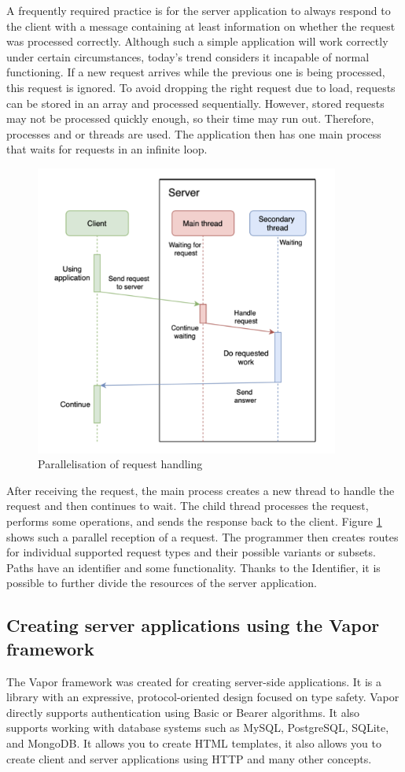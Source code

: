 \documentclass[
  biblatex = false,
  language=english,
  figures=false,
  sourcecodes,
  glossaries,
  index
]{kidiplom}
\begin{document}
A frequently required practice is for the server application to always respond to the client with a message containing at least information on whether the request was processed correctly.
Although such a simple application will work correctly under certain circumstances, today's trend considers it incapable of normal functioning. If a new request arrives while the previous one is being processed, this request is ignored. To avoid dropping the right request due to load, requests can be stored in an array and processed sequentially. However, stored requests may not be processed quickly enough, so their time may run out. Therefore, processes and or threads are used. The application then has one main process that waits for requests in an infinite loop.

\begin{figure}[h]
\centering
\includegraphics[width=10cm]{image1}
\caption{Parallelisation of request handling}
\label{fig:image1}
\end{figure}

After receiving the request, the main process creates a new thread to handle the request and then continues to wait. The child thread processes the request, performs some operations, and sends the response back to the client. Figure \ref{fig:image1} shows such a parallel reception of a request. The programmer then creates routes for individual supported request types and their possible variants or subsets. Paths have an identifier and some functionality. Thanks to the Identifier, it is possible to further divide the resources of the server application.

\subsection{Creating server applications using the Vapor framework}
The Vapor framework was created for creating server-side applications. It is a library with an expressive, protocol-oriented design focused on type safety. Vapor directly supports authentication using Basic or Bearer algorithms. It also supports working with database systems such as MySQL, PostgreSQL, SQLite, and MongoDB. It allows you to create HTML templates, it also allows you to create client and server applications using HTTP and many other concepts.
\end{document}
